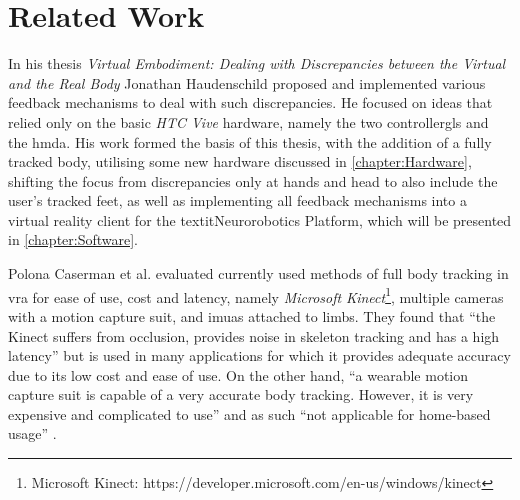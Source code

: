 \section{Related Work}

In his thesis \textit{Virtual Embodiment:  Dealing with Discrepancies between the
Virtual and the Real Body} \autocite{JohnnyVEThesis} Jonathan Haudenschild proposed and implemented various feedback mechanisms to deal with such discrepancies. He focused on ideas that relied only on the basic \textit{HTC Vive} hardware, namely the two \glspl{controllergl} and the \gls{hmda}. His work formed the basis of this thesis, with the addition of a fully tracked body, utilising some new hardware discussed in \autoref{chapter:Hardware}, shifting the focus from discrepancies only at hands and head to also include the user's tracked feet, as well as implementing all feedback mechanisms into a virtual reality client for the textit{Neurorobotics Platform}, which will be presented in \autoref{chapter:Software}. 
\newline

Polona Caserman et al. \autocite{bodyTrackingVR} evaluated currently used methods of full body tracking in \gls{vra} for ease of use, cost and latency, namely \textit{Microsoft Kinect}\footnote{Microsoft Kinect: https://developer.microsoft.com/en-us/windows/kinect}, multiple cameras with a motion capture suit, and \glspl{imua} attached to limbs.
\newline
They found that \enquote{the Kinect suffers from occlusion, provides
noise in skeleton tracking and has a high latency} \autocite[p. ~3]{bodyTrackingVR} but is used in many applications for which it provides adequate accuracy due to its low cost and ease of use. On the other hand, \enquote{a wearable motion capture suit is capable of a very accurate body tracking. However, it is very expensive and complicated to use} and as such \enquote{not applicable for home-based usage}  \autocite[p. ~3]{bodyTrackingVR}. 

